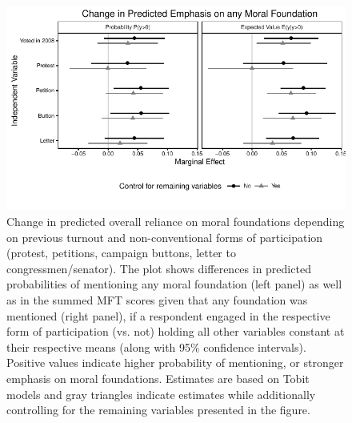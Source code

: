 \documentclass[12pt]{article}
\begin{document}
\begin{figure}[h]\centering
\includegraphics{../calc/fig/tobit_learn_participation.pdf}
\caption{Change in predicted overall reliance on moral foundations depending on previous turnout and non-conventional forms of participation (protest, petitions, campaign buttons, letter to congressmen/senator). The plot shows differences in predicted probabilities of mentioning any moral foundation (left panel) as well as in the summed MFT scores given that any foundation was mentioned (right panel), if a respondent engaged in the respective form of participation (vs. not) holding all other variables constant at their respective means (along with 95\% confidence intervals). Positive values indicate higher probability of mentioning, or stronger emphasis on moral foundations. Estimates are based on Tobit models and gray triangles indicate estimates while additionally controlling for the remaining variables presented in the figure. %
}\label{fig:tobit_learn_participation}
\end{figure}
\end{document}
